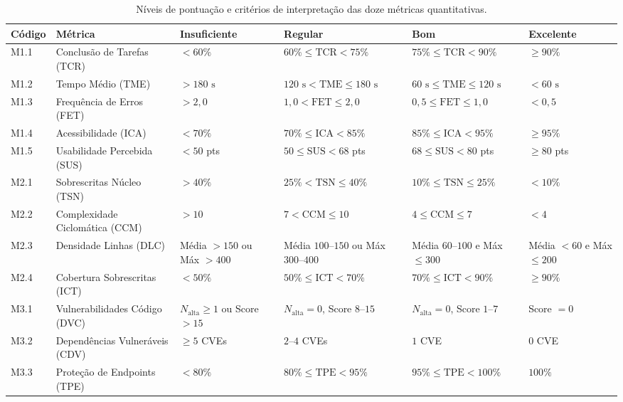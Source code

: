 \documentclass[journal]{IEEEtran}
\begin{document}
\begin{table}[!t]
\centering
\caption{Níveis de pontuação e critérios de interpretação das doze métricas quantitativas.}
\label{tab:julgamento}
\small
\begin{tabular}{@{}l p{} p{} p{} p{} p{}@{}}
\toprule
\textbf{Código} & \textbf{Métrica} & \textbf{Insuficiente} & \textbf{Regular} & \textbf{Bom} & \textbf{Excelente} \\
\midrule
M1.1 & Conclusão de Tarefas (TCR) & $< 60\%$ & $60\% \le \text{TCR} < 75\%$ & $75\% \le \text{TCR} < 90\%$ & $\ge 90\%$ \\
M1.2 & Tempo Médio (TME) & $> 180\text{ s}$ & $120\text{ s} < \text{TME} \le 180\text{ s}$ & $60\text{ s} \le \text{TME} \le 120\text{ s}$ & $< 60\text{ s}$ \\
M1.3 & Frequência de Erros (FET) & $> 2{,}0$ & $1{,}0 < \text{FET} \le 2{,}0$ & $0{,}5 \le \text{FET} \le 1{,}0$ & $< 0{,}5$ \\
M1.4 & Acessibilidade (ICA) & $< 70\%$ & $70\% \le \text{ICA} < 85\%$ & $85\% \le \text{ICA} < 95\%$ & $\ge 95\%$ \\
M1.5 & Usabilidade Percebida (SUS) & $< 50$ pts & $50 \le \text{SUS} < 68$ pts & $68 \le \text{SUS} < 80$ pts & $\ge 80$ pts \\
M2.1 & Sobrescritas Núcleo (TSN) & $> 40\%$ & $25\% < \text{TSN} \le 40\%$ & $10\% \le \text{TSN} \le 25\%$ & $< 10\%$ \\
M2.2 & Complexidade Ciclomática (CCM) & $> 10$ & $7 < \text{CCM} \le 10$ & $4 \le \text{CCM} \le 7$ & $< 4$ \\
M2.3 & Densidade Linhas (DLC) & Média $> 150$ ou Máx $> 400$ & Média $100\text{--}150$ ou Máx $300\text{--}400$ & Média $60\text{--}100$ e Máx $\le 300$ & Média $< 60$ e Máx $\le 200$ \\
M2.4 & Cobertura Sobrescritas (ICT) & $< 50\%$ & $50\% \le \text{ICT} < 70\%$ & $70\% \le \text{ICT} < 90\%$ & $\ge 90\%$ \\
M3.1 & Vulnerabilidades Código (DVC) & $N_{\text{alta}} \ge 1$ ou Score $> 15$ & $N_{\text{alta}} = 0$, Score $8\text{--}15$ & $N_{\text{alta}} = 0$, Score $1\text{--}7$ & Score $= 0$ \\
M3.2 & Dependências Vulneráveis (CDV) & $\ge 5$ CVEs & $2\text{--}4$ CVEs & $1$ CVE & $0$ CVE \\
M3.3 & Proteção de Endpoints (TPE) & $< 80\%$ & $80\% \le \text{TPE} < 95\%$ & $95\% \le \text{TPE} < 100\%$ & $100\%$ \\
\bottomrule
\end{tabular}
\end{table}
\end{document}
